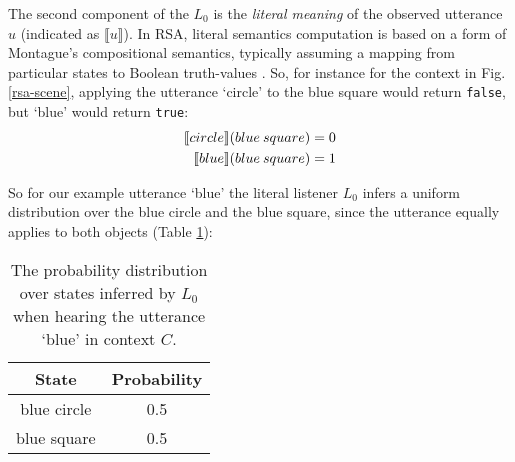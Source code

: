The second component of the $L_0$ is the \emph{literal meaning} of the observed utterance $u$ (indicated as $\llbracket u \rrbracket$). In RSA, literal semantics computation is based on a form of Montague’s compositional semantics, typically assuming a mapping from particular states to Boolean truth-values \parencite{montague1973proper} \parencite[but see e.g.][for alternative approaches]{degen2020redundancy}. 
So, for instance for the context in Fig. \ref{rsa-scene}, applying the utterance `circle' to the blue square would return \texttt{false}, but `blue' would return \texttt{true}:
\begin{align}
\llbracket circle \rrbracket (blue \: square) = 0 \notag \\
\llbracket blue \rrbracket (blue\: square) = 1
\end{align}
  
So for our example utterance `blue' the literal listener $L_0$ infers a uniform distribution over the blue circle and the blue square, since the utterance equally applies to both objects (Table \ref{rsa-l0}):

\begin{table}[h]
	\begin{center}
		\caption{The probability distribution over states inferred by $L_0$ when hearing the utterance `blue' in context $C$.}
		\label{rsa-l0}
		\vskip 0.12in
		\begin{tabular}{cc}
			State & Probability \\
			\hline
			blue circle & 0.5 \\
			blue square & 0.5 \\
			\hline
		\end{tabular}
	\end{center}
\end{table}


